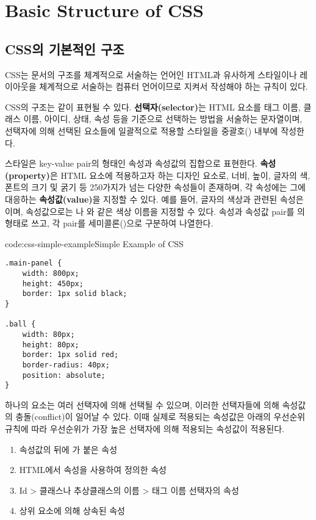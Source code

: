 \section{Basic Structure of CSS} \label{sect:basic-structure-of-css}

\subsection*{CSS의 기본적인 구조}

CSS는 문서의 구조를 체계적으로 서술하는 언어인 HTML과 유사하게 스타일이나 레이아웃을 체계적으로 서술하는 컴퓨터 언어이므로 지켜서 작성해야 하는 규칙이 있다.

    {}

CSS의 구조는 \와 같이 표현될 수 있다. \textbf{선택자(selector)}는 HTML 요소를 태그 이름, 클래스 이름, 아이디, 상태, 속성 등을 기준으로 선택하는 방법을 서술하는 문자열이며, 선택자에 의해 선택된 요소들에 일괄적으로 적용할 스타일을 중괄호(\cd{\{\}}) 내부에 작성한다.

스타일은 key-value pair의 형태인 속성과 속성값의 집합으로 표현한다. \textbf{속성(property)}은 HTML 요소에 적용하고자 하는 디자인 요소로, 너비, 높이, 글자의 색, 폰트의 크기 및 굵기 등 250가지가 넘는 다양한 속성들이 존재하며, 각 속성에는 그에 대응하는 \textbf{속성값(value)}을 지정할 수 있다. 예를 들어, 글자의 색상과 관련된 속성은 이며, 속성값으로는 나 와 같은 색상 이름을 지정할 수 있다. 속성과 속성값 pair를 의 형태로 쓰고, 각 pair를 세미콜론(\cd{;})으로 구분하여 나열한다.

\begin{codeenv}{code:css-simple-example}{Simple Example of CSS}\begin{verbatim}
.main-panel {
    width: 800px;
    height: 450px;
    border: 1px solid black;
}

.ball {
    width: 80px;
    height: 80px;
    border: 1px solid red;
    border-radius: 40px;
    position: absolute;
}
\end{verbatim}
\end{codeenv}

하나의 요소는 여러 선택자에 의해 선택될 수 있으며, 이러한 선택자들에 의해 속성값의 충돌(conflict)이 일어날 수 있다. 이때 실제로 적용되는 속성값은 아래의 우선순위 규칙에 따라 우선순위가 가장 높은 선택자에 의해 적용되는 속성값이 적용된다.

\begin{enumerate}
    \item 속성값의 뒤에 가 붙은 속성
    \item HTML에서  속성을 사용하여 정의한 속성
    \item Id {\textgreater} 클래스나 추상클래스의 이름 {\textgreater} 태그 이름 선택자의 속성
    \item 상위 요소에 의해 상속된 속성
\end{enumerate}


